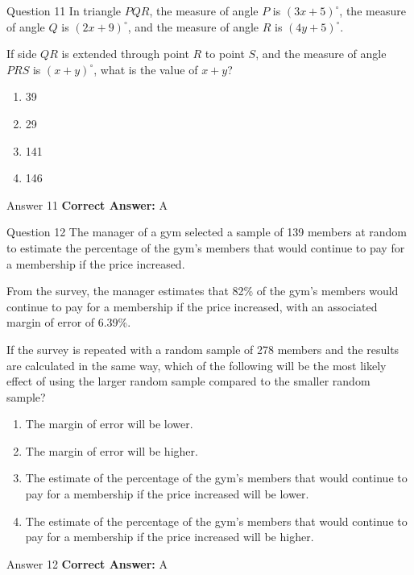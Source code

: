 \documentclass{beamer}
\begin{document}
\begin{frame}{Question 11}
\small
In triangle \(PQR\), the measure of angle \(P\) is \((3x + 5)^\circ\), the measure of angle \(Q\) is \((2x + 9)^\circ\), and the measure of angle \(R\) is \((4y + 5)^\circ\).

If side \(QR\) is extended through point \(R\) to point \(S\), and the measure of angle \(PRS\) is \((x + y)^\circ\), what is the value of \(x + y\)?
\vspace{0.35cm}
\begin{enumerate}
    \item[A.] 39
    \item[B.] 29
    \item[C.] 141
    \item[D.] 146
\end{enumerate}
\end{frame}
\begin{frame}{Answer 11}
\small
\textbf{Correct Answer:} A
\end{frame}

\begin{frame}{Question 12}
\small
The manager of a gym selected a sample of 139 members at random to estimate the percentage of the gym's members that would continue to pay for a membership if the price increased.

From the survey, the manager estimates that 82\% of the gym's members would continue to pay for a membership if the price increased, with an associated margin of error of 6.39\%.

If the survey is repeated with a random sample of 278 members and the results are calculated in the same way, which of the following will be the most likely effect of using the larger random sample compared to the smaller random sample?
\vspace{0.35cm}
\begin{enumerate}
    \item[A.] The margin of error will be lower.
    \item[B.] The margin of error will be higher.
    \item[C.] The estimate of the percentage of the gym's members that would continue to pay for a membership if the price increased will be lower.
    \item[D.] The estimate of the percentage of the gym's members that would continue to pay for a membership if the price increased will be higher.
\end{enumerate}
\end{frame}
\begin{frame}{Answer 12}
\small
\textbf{Correct Answer:} A
\end{frame}
\end{document}
